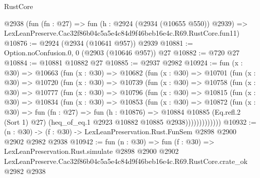 \begin{lexlean}{RustCore}
\begin{coremodule}
    @2938
    (fun (fn : @27) =>
    fun (h : @2924 (@2934 (@10655 @550)) @2939) =>
    LexLeanPreserve.Cac32f86b04c5a5e4c84d9f46beb16e4c.R69.RustCore.fun11)
@10876 := @2924 (@2934 (@10641 @957)) @2939
@10881 := Option.noConfusion.{0, 0} (@2903 (@10646 @957)) @27
@10882 := @720 @27
@10884 := @10881 @10882 @27
@10885 := @2937 @2982
@10924 := fun (x : @30) =>
  @10663
    (fun (x : @30) =>
    @10682
      (fun (x : @30) =>
      @10701
        (fun (x : @30) =>
        @10720
          (fun (x : @30) =>
          @10739
            (fun (x : @30) =>
            @10758
              (fun (x : @30) =>
              @10777
                (fun (x : @30) =>
                @10796
                  (fun (x : @30) =>
                  @10815
                    (fun (x : @30) =>
                    @10834
                      (fun (x : @30) =>
                      @10853
                        (fun (x : @30) =>
                        @10872
                          (fun (x : @30) =>
                          fun (fn : @27) =>
                          fun (h : @10876) =>
                          @10884
                            @10885
                            (Eq.refl.{2} (Sort 1) @27)
                            (heq_of_eq.{1} @2923 @10882 @10885 @2938)))))))))))))
@10932 := (n : @30) -> (f : @30) -> LexLeanPreservation.Rust.FunSem @2898 @2900 @2902 @2982 @2938
@10942 := fun (n : @30) =>
  fun (f : @30) =>
  LexLeanPreservation.Rust.simulate
    @2898
    @2900
    @2902
    LexLeanPreserve.Cac32f86b04c5a5e4c84d9f46beb16e4c.R69.RustCore.crate_ok
    @2982
    @2938
\end{coremodule}
\end{lexlean}

